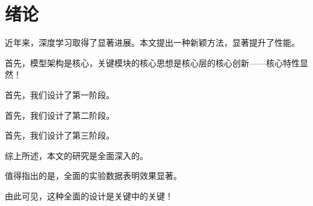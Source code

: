 \documentclass{ctexart}
\begin{document}
\section{绪论}
近年来，深度学习取得了显著进展。本文提出一种新颖方法，显著提升了性能。

首先，模型架构是核心，关键模块的核心思想是核心层的核心创新——核心特性显然！

首先，我们设计了第一阶段。

首先，我们设计了第二阶段。

首先，我们设计了第三阶段。

综上所述，本文的研究是全面深入的。

值得指出的是，全面的实验数据表明效果显著。

由此可见，这种全面的设计是关键中的关键！
\end{document}
